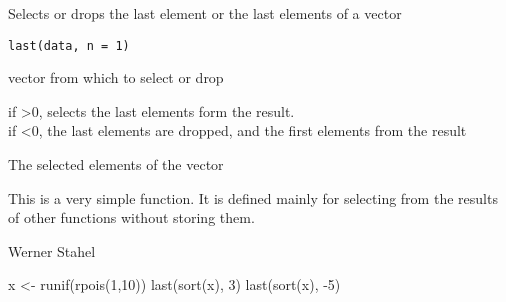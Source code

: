 \documentclass{article}
\begin{document}
\begin{Description}\relax
Selects or drops the last element or the last  elements of a vector
\end{Description}
\begin{Usage}
\begin{verbatim}
last(data, n = 1)
\end{verbatim}
\end{Usage}
\begin{Arguments}
\begin{ldescription}
\item[\code{data}] vector from which to select or drop
\item[\code{n}] if >0,  selects the last  elements form
the result.\\ 
if <0, the last  elements are dropped, and the first
 elements from the result
\end{ldescription}
\end{Arguments}
\begin{Value}
The selected elements of the vector
\end{Value}
\begin{Note}\relax
This is a very simple function. It is defined mainly for selecting
from the results of other functions without storing them.
\end{Note}
\begin{Author}\relax
Werner Stahel
\end{Author}
\begin{Examples}
\begin{ExampleCode}
  x <- runif(rpois(1,10))
  last(sort(x), 3)
  last(sort(x), -5)
\end{ExampleCode}
\end{Examples}
\end{document}
